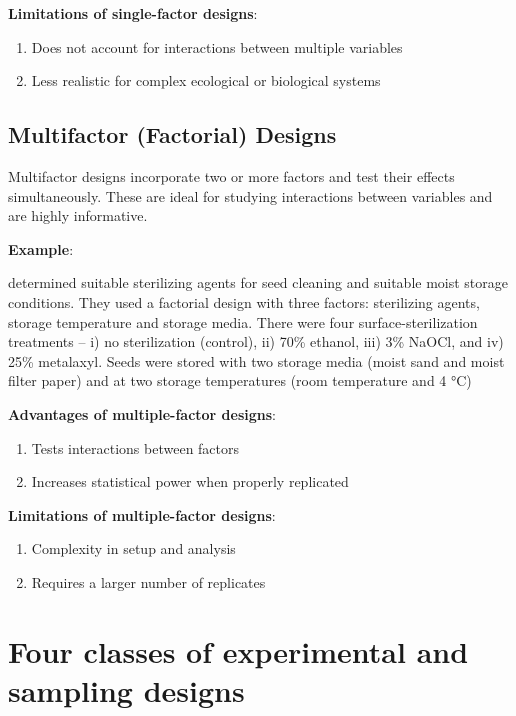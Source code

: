 \documentclass[
]{book}
\providecommand{\tightlist}{%
  \setlength{\itemsep}{0pt}\setlength{\parskip}{0pt}}
\begin{document}
\textbf{Limitations of single-factor designs}:

\begin{enumerate}
\def\labelenumi{\arabic{enumi}.}
\tightlist
\item
  Does not account for interactions between multiple variables
\item
  Less realistic for complex ecological or biological systems
\end{enumerate}

\subsection{Multifactor (Factorial) Designs}\label{multifactor-factorial-designs}

Multifactor designs incorporate two or more factors and test their effects simultaneously. These are ideal for studying interactions between variables and are highly informative.

\textbf{Example}:

\citet{yiamthaisong2024} determined suitable sterilizing agents for seed cleaning and suitable moist storage conditions. They used a factorial design with three factors: sterilizing agents, storage temperature and storage media. There were four surface-sterilization treatments -- i) no sterilization (control), ii) 70\% ethanol, iii) 3\% NaOCl, and iv) 25\% metalaxyl. Seeds were stored with two storage media (moist sand and moist filter paper) and at two storage temperatures (room temperature and 4 °C)

\textbf{Advantages of multiple-factor designs}:

\begin{enumerate}
\def\labelenumi{\arabic{enumi}.}
\tightlist
\item
  Tests interactions between factors
\item
  Increases statistical power when properly replicated
\end{enumerate}

\textbf{Limitations of multiple-factor designs}:

\begin{enumerate}
\def\labelenumi{\arabic{enumi}.}
\tightlist
\item
  Complexity in setup and analysis
\item
  Requires a larger number of replicates
\end{enumerate}

\section{Four classes of experimental and sampling designs}\label{four-classes-of-experimental-and-sampling-designs}
\end{document}
